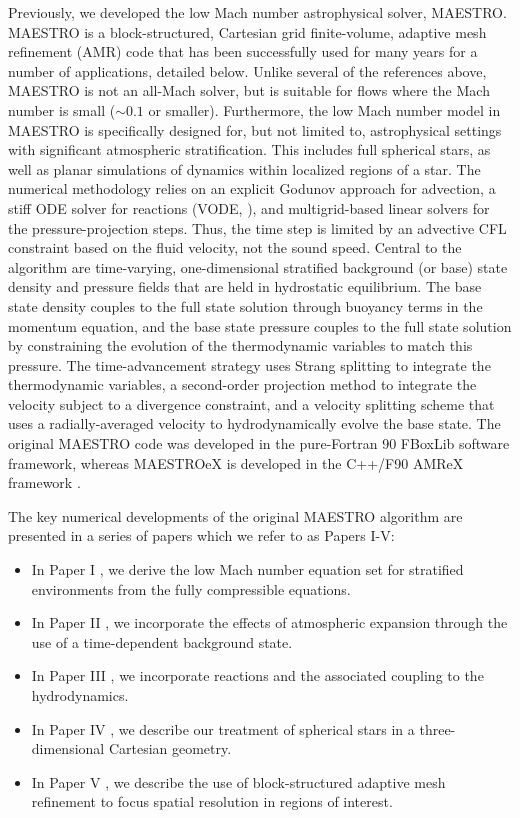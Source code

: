 Previously, we developed the low Mach number astrophysical solver, MAESTRO.
MAESTRO is a block-structured, Cartesian grid finite-volume, adaptive mesh refinement (AMR)
code that has been successfully used for many years for a number of applications, detailed below.
Unlike several of the references above, MAESTRO is not an all-Mach solver, but is suitable for
flows where the Mach number is small ($\sim 0.1$ or smaller).
Furthermore, the low Mach number model in MAESTRO is specifically designed for, but not limited
to, astrophysical settings with significant atmospheric stratification.
This includes full spherical stars, as well as planar simulations of dynamics within localized
regions of a star.
The numerical methodology relies on an explicit Godunov approach for advection, a stiff ODE
solver for reactions (VODE, \citealt{vode}), and multigrid-based linear solvers for the
pressure-projection steps.  Thus, the time step is limited by an advective CFL constraint based on the 
fluid velocity, not the sound speed.
Central to the algorithm are time-varying, one-dimensional stratified background (or base) state
density and pressure fields that are held in hydrostatic equilibrium.
The base state density couples to the full state solution through buoyancy terms in the momentum equation,
and the base state pressure couples to the full state solution by constraining the evolution of the
thermodynamic variables to match this pressure.
The time-advancement strategy uses Strang splitting to integrate the thermodynamic variables, a
second-order projection method to integrate the velocity subject to a divergence constraint,
and a velocity splitting scheme that uses a radially-averaged velocity to hydrodynamically evolve the base state.
The original MAESTRO code was developed in the pure-Fortran 90 FBoxLib software framework, whereas
MAESTROeX is developed in the C++/F90 AMReX framework \citep{AMReX,AMReX_JOSS}.

The key numerical developments of the original MAESTRO algorithm are presented in a series of
papers which we refer to as Papers I-V:
\begin{itemize}
\item In Paper I \citep{MAESTRO_I}, we derive the low Mach number equation set for stratified
environments from the fully compressible equations.
\item In Paper II \citep{MAESTRO_II}, we incorporate the effects of atmospheric expansion
through the use of a time-dependent background state.
\item In Paper III \citep{MAESTRO_III}, we incorporate reactions and the associated coupling
to the hydrodynamics.
\item In Paper IV \citep{MAESTRO_IV}, we describe our treatment of spherical stars in a
three-dimensional Cartesian geometry.
\item In Paper V \citep{MAESTRO_V}, we describe the use of block-structured adaptive mesh
refinement to focus spatial resolution in regions of interest.
\end{itemize}

